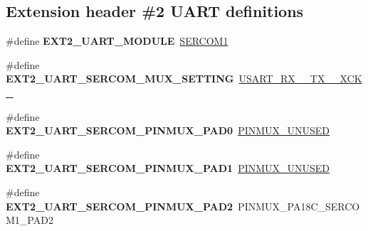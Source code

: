 \subsection*{Extension header \#2 U\+A\+R\+T definitions}
\begin{DoxyCompactItemize}
\item 
\hypertarget{group__saml21__xplained__pro__features__group_gadb664e595fbdde6e3c1a11a238dc3841}{}\#define {\bfseries E\+X\+T2\+\_\+\+U\+A\+R\+T\+\_\+\+M\+O\+D\+U\+L\+E}~\hyperlink{group___s_a_m_l21_j18_a__base_ga130d7d7bc9ef1da1ba1bd094b42449d7}{S\+E\+R\+C\+O\+M1}\label{group__saml21__xplained__pro__features__group_gadb664e595fbdde6e3c1a11a238dc3841}

\item 
\hypertarget{group__saml21__xplained__pro__features__group_gabc611f94ac99344209927a3e6572b29c}{}\#define {\bfseries E\+X\+T2\+\_\+\+U\+A\+R\+T\+\_\+\+S\+E\+R\+C\+O\+M\+\_\+\+M\+U\+X\+\_\+\+S\+E\+T\+T\+I\+N\+G}~\hyperlink{group__asfdoc__sam0__sercom__usart__group_gga87bbdb9f7edb3f1866aeb498bf7c9077a026e9eb10b4f94b2a0e5640a9fe22544}{U\+S\+A\+R\+T\+\_\+\+R\+X\+\_\+\_\+\+T\+X\+\_\+\_\+\+X\+C\+K\+\_}\label{group__saml21__xplained__pro__features__group_gabc611f94ac99344209927a3e6572b29c}

\item 
\hypertarget{group__saml21__xplained__pro__features__group_gaaa9974098a22d4acd21b63a5b19bf06e}{}\#define {\bfseries E\+X\+T2\+\_\+\+U\+A\+R\+T\+\_\+\+S\+E\+R\+C\+O\+M\+\_\+\+P\+I\+N\+M\+U\+X\+\_\+\+P\+A\+D0}~\hyperlink{group__asfdoc__sam0__sercom__usart__group_gaffde9ff712058ef836127e1f3368889e}{P\+I\+N\+M\+U\+X\+\_\+\+U\+N\+U\+S\+E\+D}\label{group__saml21__xplained__pro__features__group_gaaa9974098a22d4acd21b63a5b19bf06e}

\item 
\hypertarget{group__saml21__xplained__pro__features__group_ga8ed7752fb315ddf974e874e1815ccb9a}{}\#define {\bfseries E\+X\+T2\+\_\+\+U\+A\+R\+T\+\_\+\+S\+E\+R\+C\+O\+M\+\_\+\+P\+I\+N\+M\+U\+X\+\_\+\+P\+A\+D1}~\hyperlink{group__asfdoc__sam0__sercom__usart__group_gaffde9ff712058ef836127e1f3368889e}{P\+I\+N\+M\+U\+X\+\_\+\+U\+N\+U\+S\+E\+D}\label{group__saml21__xplained__pro__features__group_ga8ed7752fb315ddf974e874e1815ccb9a}

\item 
\hypertarget{group__saml21__xplained__pro__features__group_ga78d4c7cb399b582d447aa8b7521ccd9a}{}\#define {\bfseries E\+X\+T2\+\_\+\+U\+A\+R\+T\+\_\+\+S\+E\+R\+C\+O\+M\+\_\+\+P\+I\+N\+M\+U\+X\+\_\+\+P\+A\+D2}~P\+I\+N\+M\+U\+X\+\_\+\+P\+A18\+C\+\_\+\+S\+E\+R\+C\+O\+M1\+\_\+\+P\+A\+D2\label{group__saml21__xplained__pro__features__group_ga78d4c7cb399b582d447aa8b7521ccd9a}


\end{DoxyCompactItemize}
